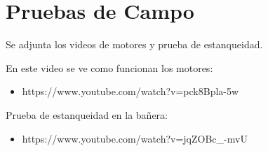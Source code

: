\chapter{Pruebas de Campo}

Se adjunta los videos de motores y prueba de estanqueidad.

En este video se ve como funcionan los motores:
\begin{itemize}
 \item https://www.youtube.com/watch?v=pck8Bpla-5w
\end{itemize}


Prueba de estanqueidad en la bañera:
\begin{itemize}
 \item https://www.youtube.com/watch?v=jqZOBc\_-mvU
\end{itemize}